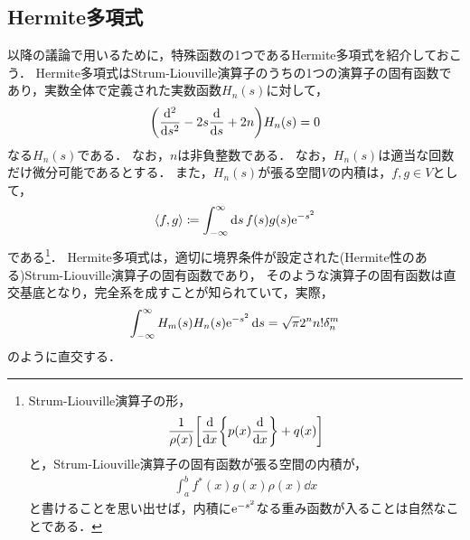 \documentclass{report}
\begin{document}
  \subsection{Hermite多項式}
    以降の議論で用いるために，特殊函数の1つであるHermite多項式を紹介しておこう．
    Hermite多項式はStrum-Liouville演算子のうちの1つの演算子の固有函数であり，実数全体で定義された実数函数$H_n(s)$に対して，
    \begin{align}
      \qty(\dv[2]{s} - 2s\dv{s} + 2n)H_n(s) = 0\label{hermite-polynominal-def}
    \end{align}
    なる$H_n(s)$である．
    なお，$n$は非負整数である．
    なお，$H_n(s)$は適当な回数だけ微分可能であるとする．
    また，$H_n(s)$が張る空間$V$の内積は，$f, g\in V$として，
    \begin{align}
      \left\langle f, g \right\rangle \coloneqq \int_{-\infty}^{\infty}\dd{s}f(s)g(s)\mathrm{e}^{-s^2}
    \end{align}
    である\footnote{
      Strum-Liouville演算子の形，
      \begin{align*}
        \frac{1}{\rho(x)}\qty[\dv{x}\qty{p(x)\dv{x}} + q(x)]
      \end{align*}
      と，Strum-Liouville演算子の固有函数が張る空間の内積が，
      \begin{align*}
        \int_{a}^{b} f^*(x)g(x)\rho(x)\dd{x}
      \end{align*}
      と書けることを思い出せば，内積に$\mathrm{e}^{-s^2}$なる重み函数が入ることは自然なことである．
    }．
    Hermite多項式は，適切に境界条件が設定された(Hermite性のある)Strum-Liouville演算子の固有函数であり，
    そのような演算子の固有函数は直交基底となり，完全系を成すことが知られていて，実際，
    \begin{align}
      \int_{-\infty}^{\infty}H_m(s)H_n(s)\mathrm{e}^{-s^2}\dd{s} = \sqrt{\pi}2^nn!\delta_n^m
    \end{align}
    のように直交する．
\end{document}
